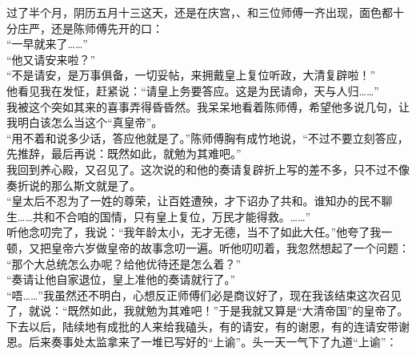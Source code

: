 过了半个月，阴历五月十三这天，还是在庆宫，、和三位师傅一齐出现，面色都十分庄严，还是陈师傅先开的口：\\

“一早就来了……”\\

“他又请安来啦？”\\

“不是请安，是万事俱备，一切妥帖，来拥戴皇上复位听政，大清复辟啦！”\\

他看见我在发怔，赶紧说：“请皇上务要答应。这是为民请命，天与人归……”\\

我被这个突如其来的喜事弄得昏昏然。我呆呆地看着陈师傅，希望他多说几句，让我明白该怎么当这个“真皇帝”。\\

“用不着和说多少话，答应他就是了。”陈师傅胸有成竹地说，“不过不要立刻答应，先推辞，最后再说：既然如此，就勉为其难吧。”\\

我回到养心殿，又召见了。这次说的和他的奏请复辟折上写的差不多，只不过不像奏折说的那么斯文就是了。\\

“皇太后不忍为了一姓的尊荣，让百姓遭殃，才下诏办了共和。谁知办的民不聊生……共和不合咱的国情，只有皇上复位，万民才能得救。……”\\

听他念叨完了，我说：“我年龄太小，无才无德，当不了如此大任。”他夸了我一顿，又把皇帝六岁做皇帝的故事念叨一遍。听他叨叨着，我忽然想起了一个问题：\\

“那个大总统怎么办呢？给他优待还是怎么着？”\\

“奏请让他自家退位，皇上准他的奏请就行了。”\\

“唔……”我虽然还不明白，心想反正师傅们必是商议好了，现在我该结束这次召见了，就说：“既然如此，我就勉为其难吧！”于是我就又算是“大清帝国”的皇帝了。\\

下去以后，陆续地有成批的人来给我磕头，有的请安，有的谢恩，有的连请安带谢恩。后来奏事处太监拿来了一堆已写好的“上谕”。头一天一气下了九道“上谕”：\\

